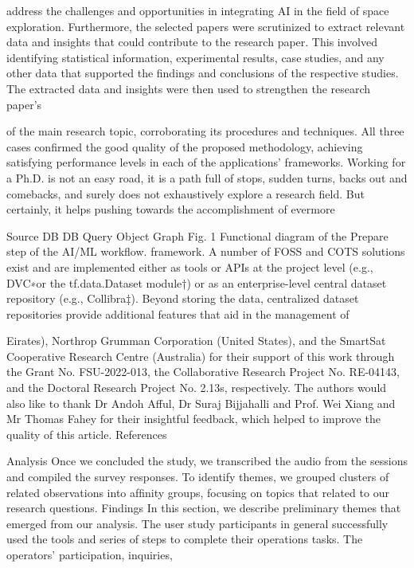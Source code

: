 \documentclass[a4paper,12pt]{article}
\begin{document}
address 
the 
challenges 
and 
opportunities in integrating AI in the field of space 
exploration. 
Furthermore, the selected papers were scrutinized to 
extract relevant data and insights that could 
contribute to the research paper. This involved 
identifying statistical information, experimental 
results, case studies, and any other data that 
supported the findings and conclusions of the 
respective studies. The extracted data and insights 
were then used to strengthen the research paper's

of the main research topic, corroborating its procedures and techniques. All
three cases confirmed the good quality of the proposed methodology, achieving
satisfying performance levels in each of the applications’ frameworks.
Working for a Ph.D. is not an easy road, it is a path full of stops, sudden turns,
backs out and comebacks, and surely does not exhaustively explore a research
field. But certainly, it helps pushing towards the accomplishment of evermore

Source
DB
DB
Query
Object
Graph
Fig. 1
Functional diagram of the Prepare step of the AI/ML workﬂow.
framework. A number of FOSS and COTS solutions exist and are implemented either as tools or APIs at the project
level (e.g., DVC∗or the tf.data.Dataset module†) or as an enterprise-level central dataset repository (e.g., Collibra‡).
Beyond storing the data, centralized dataset repositories provide additional features that aid in the management of

Eirates), Northrop Grumman Corporation (United States), and the 
SmartSat Cooperative Research Centre (Australia) for their support of 
this work through the Grant No. FSU-2022-013, the Collaborative 
Research Project No. RE-04143, and the Doctoral Research Project No. 
2.13s, respectively. The authors would also like to thank Dr Andoh Afful, 
Dr Suraj Bijjahalli and Prof. Wei Xiang and Mr Thomas Fahey for their 
insightful feedback, which helped to improve the quality of this article. 
References

Analysis
Once we concluded the study, we transcribed the audio from
the sessions and compiled the survey responses. To identify
themes, we grouped clusters of related observations into
afﬁnity groups, focusing on topics that related to our research
questions.
Findings
In this section, we describe preliminary themes that emerged
from our analysis.
The user study participants in general
successfully used the tools and series of steps to complete
their operations tasks. The operators’ participation, inquiries,
\end{document}

